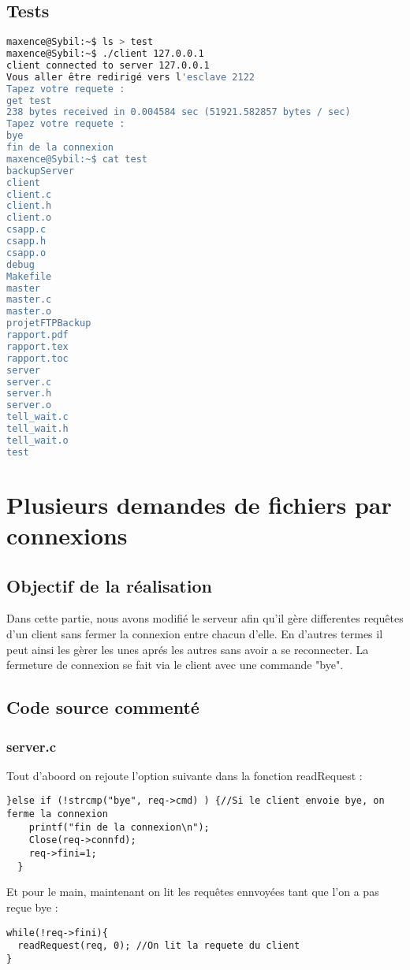 \documentclass{report}
\begin{document}
      \section{Tests}
\begin{lstlisting}[frame=single,basicstyle=\footnotesize,language=bash]
maxence@Sybil:~$ ls > test
maxence@Sybil:~$ ./client 127.0.0.1
client connected to server 127.0.0.1
Vous aller être redirigé vers l'esclave 2122
Tapez votre requete :
get test
238 bytes received in 0.004584 sec (51921.582857 bytes / sec)
Tapez votre requete :
bye
fin de la connexion
maxence@Sybil:~$ cat test
backupServer
client
client.c
client.h
client.o
csapp.c
csapp.h
csapp.o
debug
Makefile
master
master.c
master.o
projetFTPBackup
rapport.pdf
rapport.tex
rapport.toc
server
server.c
server.h
server.o
tell_wait.c
tell_wait.h
tell_wait.o
test
\end{lstlisting}
    \chapter{Plusieurs demandes de fichiers par connexions}
      \section{Objectif de la r\'ealisation}
	Dans cette partie, nous avons modifi\'e le serveur afin qu'il g\`ere differentes requ\^etes d'un client sans fermer la connexion
  entre chacun d'elle. En d'autres termes il peut ainsi les g\`erer les unes apr\'es les autres sans avoir a se reconnecter.
  La fermeture de connexion se fait via le client avec une commande "bye".
      \section{Code source comment\'e}
      \subsection{server.c}
      Tout d'aboord on rejoute l'option suivante dans la fonction readRequest :
      \begin{lstlisting}
}else if (!strcmp("bye", req->cmd) ) {//Si le client envoie bye, on ferme la connexion
	printf("fin de la connexion\n");
  	Close(req->connfd);
  	req->fini=1;
  }
      \end{lstlisting}
      Et pour le main, maintenant on lit les requ\^etes ennvoy\'ees tant que l'on a pas re\c cue bye :
      \begin{lstlisting}
while(!req->fini){
  readRequest(req, 0); //On lit la requete du client
}
      \end{lstlisting}
\end{document}
